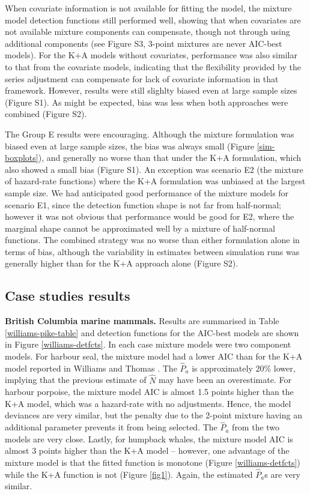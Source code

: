 \documentclass[10pt]{article}
\begin{document}
When covariate information is not available for fitting the model, the mixture model detection functions still performed well, showing that when covariates are not available mixture components can compensate, though not through using additional components (see Figure S3, 3-point mixtures are never AIC-best models).  For the K+A models without covariates, performance was also similar to that from the covariate models, indicating that the flexibility provided by the series adjustment can compensate for lack of covariate information in that framework.  However, results were still slighlty biased even at large sample sizes (Figure S1).  As might be expected, bias was less when both approaches were combined (Figure S2).

The Group E results were encouraging.  Although the mixture formulation was biased even at large sample sizes, the bias was always small (Figure \ref{sim-boxplots}), and generally no worse than that under the K+A formulation, which also showed a small bias (Figure S1).  An exception was scenario E2 (the mixture of hazard-rate functions) where the K+A formulation was unbiased at the largest sample size.  We had anticipated good performance of the mixture models for scenario E1, since the detection function shape is not far from half-normal; however it was not obvious that performance would be good for E2, where the marginal shape cannot be approximated well by a mixture of half-normal functions.  The combined strategy was no worse than either formulation alone in terms of bias, although the variability in estimates between simulation runs was generally higher than for the K+A approach alone (Figure S2).  


\subsection*{Case studies results}

\textbf{British Columbia marine mammals.} Results are summarised in Table \ref{williams-pike-table} and detection functions for the AIC-best models are shown in Figure \ref{williams-detfcts}. In each case mixture models were two component models.  For harbour seal, the mixture model had a lower AIC than for the K+A model reported in Williams and Thomas \cite{Williams:2007tc}. The $\hat{P}_a$ is approximately 20\% lower, implying that the previous estimate of $\hat{N}$ may have been an overestimate.  For harbour porpoise, the mixture model AIC is almost 1.5 points higher than the K+A model, which was a hazard-rate with no adjustments.  Hence, the model deviances are very similar, but the penalty due to the 2-point mixture having an additional parameter prevents it from being selected.  The $\hat{P}_a$ from the two models are very close.  Lastly, for humpback whales, the mixture model AIC is almost 3 points higher than the K+A model -- however, one advantage of the mixture model is that the fitted function is monotone (Figure \ref{williams-detfcts}) while the K+A function is not (Figure \ref{fig1}).  Again, the estimated $\hat{P}_a$s are very similar.
\end{document}
